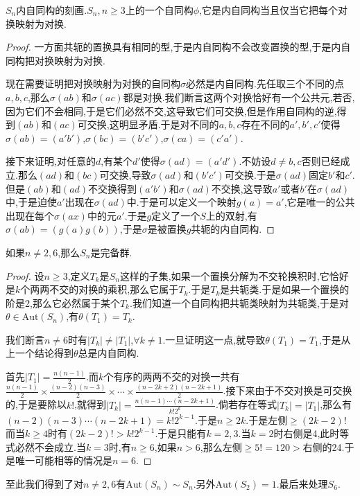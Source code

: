 $S_n$内自同构的刻画.$S_n,n\ge3$上的一个自同构$\phi$,它是内自同构当且仅当它把每个对换映射为对换.
\begin{proof}
	
	一方面共轭的置换具有相同的型,于是内自同构不会改变置换的型,于是内自同构把对换映射为对换.
	
	现在需要证明把对换映射为对换的自同构$\sigma$必然是内自同构.先任取三个不同的点$a,b,c$,那么$\sigma(ab)$和$\sigma(ac)$都是对换.我们断言这两个对换恰好有一个公共元,若否,因为它们不会相同,于是它们必然不交,这导致它们可交换,但是作用自同构的逆,得到$(ab)$和$(ac)$可交换,这明显矛盾.于是对不同的$a,b,c$存在不同的$a',b',c'$使得$\sigma(ab)= (a'b')$,$\sigma(bc)=(b'c')$,$\sigma(ca)=(c'a')$.
	
	接下来证明,对任意的$d$,有某个$d'$使得$\sigma(ad)=(a'd')$.不妨设$d\not=b,c$否则已经成立.那么$(ad)$和$(bc)$可交换,导致$\sigma(ad)$和$(b'c')$可交换.于是$\sigma(ad)$固定$b'$和$c'$.但是$(ab)$和$(ad)$不交换得到$(a'b')$和$\sigma(ad)$不交换,这导致$a'$或者$b'$在$\sigma(ad)$中,于是迫使$a'$出现在$\sigma(ad)$中.于是可以定义一个映射$g(a)=a'$,它是唯一的公共出现在每个$\sigma(ax)$中的元$a'$.于是$g$定义了一个$S$上的双射,有$\sigma(ab)=(g(a)g(b))$,于是$\sigma$是被置换$g$共轭的内自同构.
\end{proof}

如果$n\not=2,6$,那么$S_n$是完备群.
\begin{proof}
	
	设$n\ge3$,定义$T_k$是$S_n$这样的子集,如果一个置换分解为不交轮换积时,它恰好是$k$个两两不交的对换的乘积,那么它属于$T_k$.于是$T_k$是共轭类.于是如果一个置换的阶是2,那么它必然属于某个$T_k$.我们知道一个自同构把共轭类映射为共轭类,于是对$\theta\in\mathrm{Aut}(S_n)$,有$\theta(T_1)=T_k$.
	
	我们断言$n\not=6$时有$|T_k|\not=|T_1|$,$\forall k\not=1$.一旦证明这一点,就导致$\theta(T_1)=T_1$,于是从上一个结论得到$\theta$总是内自同构.
	
	首先$|T_1|=\frac{n(n-1)}{2}$.而$k$个有序的两两不交的对换一共有$\frac{n(n-1)} {2}\times\frac{(n-2)(n-3)}{2}\times\cdots\times\frac{(n-2k+2)(n-2k+1)}{2}$.接下来由于不交对换是可交换的,于是要除以$k!$,就得到$|T_k|=\frac{n(n-1)\cdots(n-2k+1)}{k!2^k}$.倘若存在等式$|T_k|=|T_1|$,那么有$(n-2)(n-3)\cdots(n-2k+1)=k!2^{k-1}$.于是$n\ge2k$.于是左侧$\ge(2k-2)!$而当$k\ge4$时有$(2k-2)!>k!2^{k-1}$.于是只能有$k=2,3$.当$k=2$时右侧是4,此时等式必然不会成立.当$k=3$时,有$n\ge6$,如果$n>6$,那么左侧$\ge 5!=120>$右侧的24.于是唯一可能相等的情况是$n=6$.
\end{proof}

至此我们得到了对$n\not=2,6$有$\mathrm{Aut}(S_n)\sim S_n$.另外$\mathrm{Aut}(S_2)=1$.最后来处理$S_6$.

